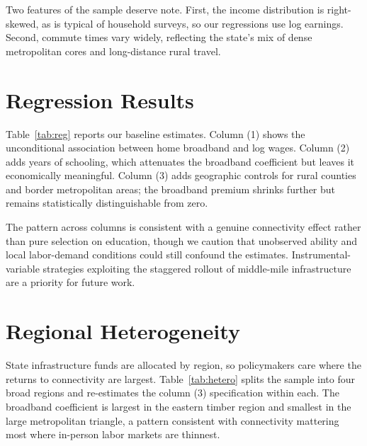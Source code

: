 \documentclass[11pt]{article}
\begin{document}
Two features of the sample deserve note. First, the income distribution is right-skewed, as is typical of household surveys, so our regressions use log earnings. Second, commute times vary widely, reflecting the state's mix of dense metropolitan cores and long-distance rural travel.

\section{Regression Results}

Table~\ref{tab:reg} reports our baseline estimates. Column (1) shows the unconditional association between home broadband and log wages. Column (2) adds years of schooling, which attenuates the broadband coefficient but leaves it economically meaningful. Column (3) adds geographic controls for rural counties and border metropolitan areas; the broadband premium shrinks further but remains statistically distinguishable from zero.

\begin{table}[htbp]
\centering
\caption{Broadband access and log hourly wages}
\label{tab:reg}

\end{table}

The pattern across columns is consistent with a genuine connectivity effect rather than pure selection on education, though we caution that unobserved ability and local labor-demand conditions could still confound the estimates. Instrumental-variable strategies exploiting the staggered rollout of middle-mile infrastructure are a priority for future work.

\section{Regional Heterogeneity}

State infrastructure funds are allocated by region, so policymakers care where the returns to connectivity are largest. Table~\ref{tab:hetero} splits the sample into four broad regions and re-estimates the column (3) specification within each. The broadband coefficient is largest in the eastern timber region and smallest in the large metropolitan triangle, a pattern consistent with connectivity mattering most where in-person labor markets are thinnest.
\end{document}
